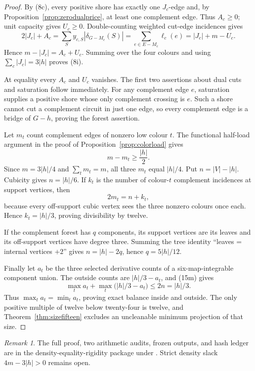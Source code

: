 \documentclass[11pt]{article}
\theoremstyle{definition}
\theoremstyle{remark}
\newtheorem{remark}[theorem]{Remark}
\begin{document}
\begin{proof}
By (8c), every positive shore has exactly one \(J_c\)-edge and, by
Proposition~\ref{prop:zerodualprice}, at least one complement edge.
Thus \(A_c\ge0\); unit capacity gives \(U_c\ge0\).
Double-counting weighted cut-edge incidences gives
\[
 2|J_c|+A_c
 =\sum_Sy_{c,S}|\delta_{G-M_c}(S)|
 =\sum_{e\in E-M_c}\ell_c(e)
 =|J_c|+m-U_c.
                                                               \tag{8k}
\]
Hence \(m-|J_c|=A_c+U_c\).  Summing over the four colours and using
\(\sum_c|J_c|=3|h|\) proves (8i).

At equality every \(A_c\) and \(U_c\) vanishes.  The first two assertions
about dual cuts and saturation follow immediately.  For any complement
edge \(e\), saturation supplies a positive shore whose only complement
crossing is \(e\).  Such a shore cannot cut a complement circuit in just
one edge, so every complement edge is a bridge of \(G-h\), proving the
forest assertion.

Let \(m_t\) count complement edges of nonzero low colour \(t\).  The
functional half-load argument in the proof of
Proposition~\ref{prop:colorload} gives
\[
                    m-m_t\ge\frac{|h|}{2}.
\]
Since \(m=3|h|/4\) and \(\sum_tm_t=m\), all three \(m_t\) equal
\(|h|/4\).  Put \(n=|V|-|h|\).  Cubicity gives \(n=|h|/6\).  If \(k_t\)
is the number of colour-\(t\) complement incidences at support vertices,
then
\[
                         2m_t=n+k_t,
\]
because every off-support cubic vertex sees the three nonzero colours
once each.  Hence \(k_t=|h|/3\), proving divisibility by twelve.

If the complement forest has \(q\) components, its support vertices are
its leaves and its off-support vertices have degree three.  Summing the
tree identity ``leaves = internal vertices \(+2\)'' gives
\(n=|h|-2q\), hence \(q=5|h|/12\).

Finally let \(a_t\) be the three selected derivative counts of a
six-map-integrable component union.  The outside counts are
\(|h|/3-a_t\), and (15m) gives
\[
 \max_ta_t+\max_t\bigl(|h|/3-a_t\bigr)\le2n=|h|/3.
\]
Thus \(\max_ta_t=\min_ta_t\), proving exact balance inside and outside.
The only positive multiple of twelve below twenty-four is twelve, and
Theorem~\ref{thm:sizefifteen} excludes an uncleanable minimum projection
of that size.
\end{proof}

\begin{remark}
The full proof, two arithmetic audits, frozen outputs, and hash ledger
are in the density-equality-rigidity package under .
Strict density slack \(4m-3|h|>0\) remains open.
\end{remark}
\end{document}
